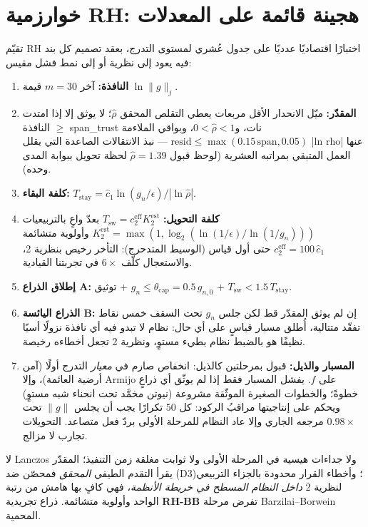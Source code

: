 ﻿\documentclass[12pt]{article}
\newcommand{\gnorm}{\lVert g\rVert}
\begin{document}
\section{خوارزمية RH: هجينة قائمة على المعدلات}\label{sec:rh}

تقيّم RH اختبارًا اقتصاديًا عدديًا على جدول عُشري لمستوى التدرج،
بعقد تصميم كل بند فيه يعود إلى نظرية أو إلى نمط فشل مقيس:

\begin{enumerate}\itemsep2pt
\item \textbf{النافذة:} آخر $m=30$ قيمة $\ln\gnorm_j$.
\item \textbf{المقدّر:} ميّل الانحدار الأقل مربعات يعطي التقلص
المحقق $\hat\rho$؛ لا يوثق إلا إذا امتدت النافذة
$\ge$ span\_trust نات، و$0<\hat\rho<1$، وبواقي الملاءمة
$\mathrm{resid}\le\max(0.15\,\mathrm{span},0.05)$ --- نبذ الانتقالات
الصاعدة التي يقلل |ln rho| عنها العمل المتبقي بمراتبه العشرية
(لوحظ قبول $\hat\rho=1.39$ لحظة تحويل ببوابة المدى وحده).
\item \textbf{كلفة البقاء:} $T_{\mathrm{stay}}
=\hat c_1\ln(g_n/\epsilon)/|\ln\hat\rho|$.
\item \textbf{كلفة التحويل:} $T_{\mathrm{sw}}=c_2^{\mathrm{eff}}K_2^{\mathrm{est}}$
بعدّ واعٍ بالتربيعيات
$K_2^{\mathrm{est}}=\max(1,\log_2(\ln(1/\epsilon)/\ln(1/g_n)))$
وأولوية متشائمة $c_2^{\mathrm{eff}}=100\,\hat c_1$ حتى أول قياس
(الوسيط المتدحرج): التأخر رخيص بنظرية 2، والاستعجال كلّف $6\times$
في تجربتنا القيادية.
\item \textbf{إطلاق الذراع A:} توثيق +
$g_n\le\theta_{\mathrm{cap}}=0.5\,g_{n,0}$ +
$T_{\mathrm{sw}}<1.5\,T_{\mathrm{stay}}$.
\item \textbf{الذراع اليائسة B:} إن لم يوثق المقدّر قط لكن جلس $g_n$
تحت السقف خمس نقاط تفقّد متتالية، أُطلق مسبار قياسٍ على أي حال: نظام
لا تبدو فيه أي نافذة نزولًا أسيًا نظيفًا هو بالضبط نظام بطيء مستوٍ،
ونظرية 2 تجعل أخطاءه رخيصة.
\item \textbf{المسبار والذيل:} قبول بمرحلتين كالذيل: انخفاص صارم في
\emph{معيار} التدرج أولًا (آمن أرضية العائمة)، وإلا Armijo على $f$.
يفشل المسبار فقط إذا لم يوثّق أي ذراعٍ خطوةً؛ والخطوات الصغيرة
الموثّقة مشروعة (نيوتن مخمَّد تحت انحناء شبه مستوٍ) ويحكم على إنتاجيتها
مراقبُ الركود: كل $50$ تكرارًا يجب أن يجلس $\gnorm$ تحت
$0.98\times$ مرجعه الجاري وإلا عاد النظام للمرحلة الأولى بردّ فعل
متصاعد. التحويلات تجارب لا مزالج.
\end{enumerate}

لا Lanczos ولا جداءات هيسية في المرحلة الأولى ولا ثوابت مغلقة زمن
التنفيذ؛ المقدّر يقرأ التقدم الطيفي \emph{المحقق} فمحصّن ضد (D3)؛
وأخطاء القرار محدودة بالجزاء التربيعي لنظرية 2 \emph{داخل النظام
المسطح في خريطة الأنظمة}، فهي كافٍ بها هامش من رتبة الواحد وأولوية
متشائمة. ذراع تجريدية \textbf{RH-BB} تفرض مرحلة Barzilai--Borwein
المحمية.
\end{document}
